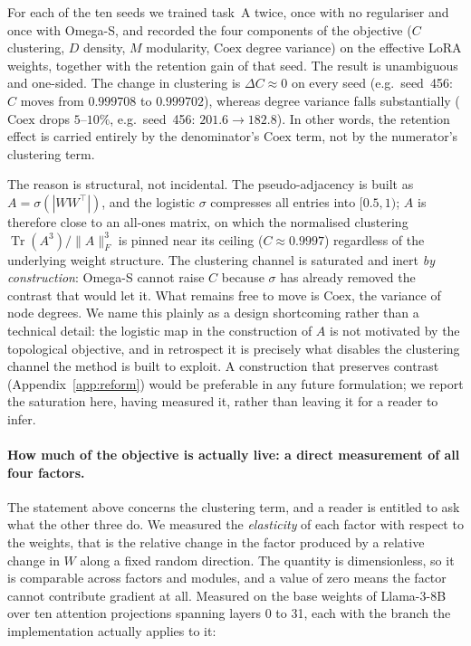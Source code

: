 \documentclass[11pt,a4paper]{article}
\begin{document}
For each of the ten seeds we trained task~A twice, once with no regulariser
and once with Omega-S, and recorded the four components of the objective
($C$ clustering, $D$ density, $M$ modularity, $\mathrm{Coex}$ degree
variance) on the effective LoRA weights, together with the retention gain of
that seed. The result is unambiguous and one-sided. The change in clustering
is $\Delta C \approx 0$ on every seed (e.g.\ seed~456: $C$ moves from
$0.999708$ to $0.999702$), whereas degree variance falls substantially
($\mathrm{Coex}$ drops $5$--$10\%$, e.g.\ seed~456: $201.6\to182.8$). In
other words, the retention effect is carried entirely by the denominator's
$\mathrm{Coex}$ term, not by the numerator's clustering term.

The reason is structural, not incidental. The pseudo-adjacency is built as
$A=\sigma(|WW^\top|)$, and the logistic $\sigma$ compresses all entries into
$[0.5,1)$; $A$ is therefore close to an all-ones matrix, on which the
normalised clustering $\operatorname{Tr}(A^3)/\lVert A\rVert_F^3$ is pinned
near its ceiling ($C\approx0.9997$) regardless of the underlying weight
structure. The clustering channel is saturated and inert \emph{by
construction}: Omega-S cannot raise $C$ because $\sigma$ has already removed
the contrast that would let it. What remains free to move is $\mathrm{Coex}$,
the variance of node degrees. We name this plainly as a design shortcoming
rather than a technical detail: the logistic map in the construction of $A$
is not motivated by the topological objective, and in retrospect it is
precisely what disables the clustering channel the method is built to
exploit. A construction that preserves contrast
(Appendix~\ref{app:reform}) would be preferable in any future formulation;
we report the saturation here, having measured it, rather than leaving it
for a reader to infer.

\paragraph{How much of the objective is actually live: a direct measurement of
all four factors.} The statement above concerns the clustering term, and a
reader is entitled to ask what the other three do. We measured the
\emph{elasticity} of each factor with respect to the weights, that is the
relative change in the factor produced by a relative change in $W$ along a
fixed random direction. The quantity is dimensionless, so it is comparable
across factors and modules, and a value of zero means the factor cannot
contribute gradient at all. Measured on the base weights of Llama-3-8B over ten
attention projections spanning layers 0 to 31, each with the branch the
implementation actually applies to it:
\end{document}
